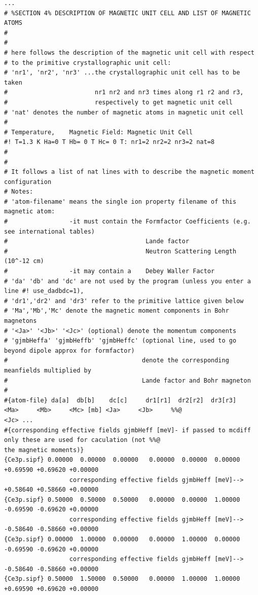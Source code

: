 {\footnotesize
\begin{verbatim}
...
# %SECTION 4% DESCRIPTION OF MAGNETIC UNIT CELL AND LIST OF MAGNETIC ATOMS
#
#
# here follows the description of the magnetic unit cell with respect
# to the primitive crystallographic unit cell:
# 'nr1', 'nr2', 'nr3' ...the crystallographic unit cell has to be taken 
#                        nr1 nr2 and nr3 times along r1 r2 and r3,
#                        respectively to get magnetic unit cell
# 'nat' denotes the number of magnetic atoms in magnetic unit cell
#
# Temperature,    Magnetic Field: Magnetic Unit Cell
#! T=1.3 K Ha=0 T Hb= 0 T Hc= 0 T: nr1=2 nr2=2 nr3=2 nat=8 
#
#
# It follows a list of nat lines with to describe the magnetic moment configuration
# Notes:
# 'atom-filename' means the single ion property filename of this magnetic atom:
#                 -it must contain the Formfactor Coefficients (e.g. see international tables)
#                                      Lande factor
#                                      Neutron Scattering Length (10^-12 cm) 
#                 -it may contain a    Debey Waller Factor
# 'da' 'db' and 'dc' are not used by the program (unless you enter a line #! use_dadbdc=1), 
# 'dr1','dr2' and 'dr3' refer to the primitive lattice given below
# 'Ma','Mb','Mc' denote the magnetic moment components in Bohr magnetons
# '<Ja>' '<Jb>' '<Jc>' (optional) denote the momentum components 
# 'gjmbHeffa' 'gjmbHeffb' 'gjmbHeffc' (optional line, used to go beyond dipole approx for formfactor)
#                                     denote the corresponding meanfields multiplied by 
#                                     Lande factor and Bohr magneton 
#
#{atom-file} da[a]  db[b]    dc[c]     dr1[r1]  dr2[r2]  dr3[r3]   <Ma>     <Mb>     <Mc> [mb] <Ja>     <Jb>     %%@
<Jc> ...
#{corresponding effective fields gjmbHeff [meV]- if passed to mcdiff only these are used for caculation (not %%@
the magnetic moments)}
{Ce3p.sipf} 0.00000  0.00000  0.00000   0.00000  0.00000  0.00000   +0.69590 +0.69620 +0.00000  
                  corresponding effective fields gjmbHeff [meV]--> +0.58640 +0.58660 +0.00000
{Ce3p.sipf} 0.50000  0.50000  0.50000   0.00000  0.00000  1.00000   -0.69590 -0.69620 +0.00000  
                  corresponding effective fields gjmbHeff [meV]--> -0.58640 -0.58660 +0.00000
{Ce3p.sipf} 0.00000  1.00000  0.00000   0.00000  1.00000  0.00000   -0.69590 -0.69620 +0.00000  
                  corresponding effective fields gjmbHeff [meV]--> -0.58640 -0.58660 +0.00000
{Ce3p.sipf} 0.50000  1.50000  0.50000   0.00000  1.00000  1.00000   +0.69590 +0.69620 +0.00000  

\end{verbatim}}
